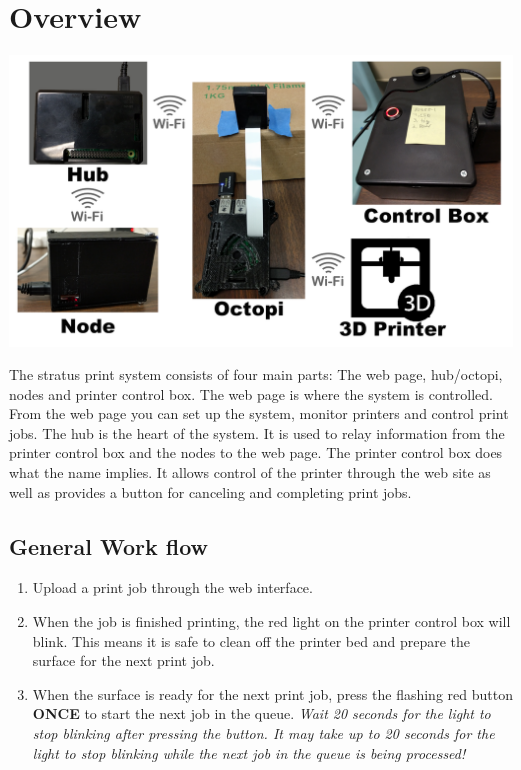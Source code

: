 


  

  \pagecolor{white}

  \tableofcontents

  \newpage

  \section{Overview}
  \begin{center}
   	\includegraphics[scale=0.25]{images/flow.png}
  \end{center}
  The stratus print system consists of four main parts: The web page, hub/octopi, nodes and printer
  control box. The web page is where the system is controlled. From the web page you can set up
  the system, monitor printers and control print jobs. The hub is the heart of the system. It is
  used to relay information from the printer control box and the nodes to the web page. The printer
  control box does what the name implies. It allows control of the printer through the web site as well
  as provides a button for canceling and completing print jobs.

  \subsection{General Work flow}
    \begin{enumerate}
      \item Upload a print job through the web interface.
      \item When the job is finished printing, the red light on the printer control box
      will blink. This means it is safe to clean off the printer bed and prepare the
      surface for the next print job.
      \item When the surface is ready for the next print job, press the flashing red button \textbf{ONCE} to start the next job in the queue.  \emph{Wait 20 seconds for the light to stop blinking after pressing the button.  It may take up to 20 seconds for the light to stop blinking while the next job in the queue is being processed!} 
    \end{enumerate}
  \newpage
  

  \newpage
  

  \newpage
  

  \newpage
  

  

